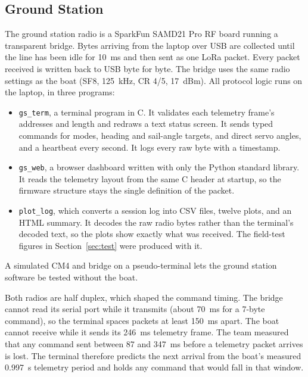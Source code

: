 \subsection{Ground Station}
The ground station radio is a SparkFun SAMD21 Pro RF board running a
transparent bridge. Bytes arriving from the laptop over USB are collected
until the line has been idle for \SI{10}{\milli\second} and then sent as one
LoRa packet. Every packet received is written back to USB byte for byte. The
bridge uses the same radio settings as the boat (SF8, \SI{125}{\kilo\hertz},
CR 4/5, \SI{17}{dBm}). All protocol logic runs on the laptop, in three
programs:
\begin{itemize}
\item \texttt{gs\_term}, a terminal program in C. It validates each telemetry
frame's addresses and length and redraws a text status screen. It sends
typed commands for modes, heading and sail-angle targets, and direct servo
angles, and a heartbeat every second. It logs every raw byte with a
timestamp.
\item \texttt{gs\_web}, a browser dashboard written with only the Python
standard library. It reads the telemetry layout from the same C header at
startup, so the firmware structure stays the single definition of the
packet.
\item \texttt{plot\_log}, which converts a session log into CSV files,
twelve plots, and an HTML summary. It decodes the raw radio bytes rather than
the terminal's decoded text, so the plots show exactly what was received. The
field-test figures in Section~\ref{sec:test} were produced with it.
\end{itemize}
A simulated CM4 and bridge on a pseudo-terminal lets the ground station
software be tested without the boat.

Both radios are half duplex, which shaped the command timing. The bridge
cannot read its serial port while it transmits (about \SI{70}{\milli\second}
for a 7-byte command), so the terminal spaces packets at least
\SI{150}{\milli\second} apart. The boat cannot receive while it sends its
\SI{246}{\milli\second} telemetry frame. The team measured that any command
sent between 87 and \SI{347}{\milli\second} before a telemetry packet arrives
is lost. The terminal therefore predicts the next arrival from the boat's
measured \SI{0.997}{\second} telemetry period and holds any command that
would fall in that window.
